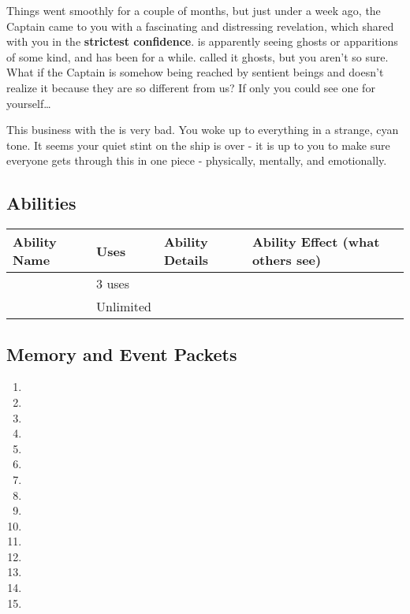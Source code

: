 \documentclass[char]{TMFHope}
\begin{document}
Things went smoothly for a couple of months, but just under a week ago, the Captain came to you with a fascinating and distressing revelation, which \cCap{\they} shared with you in the \textbf{strictest confidence}. \cCap{} is apparently seeing ghosts or apparitions of some kind, and has been for a while. \cCap{\They} called it ghosts, but you aren't so sure. What if the Captain is somehow being reached by sentient beings and doesn't realize it because they are so different from us? If only you could see one for yourself\ldots

This business with the \pNew{} is very bad. You woke up to everything in a strange, cyan tone. It seems your quiet stint on the ship is over - it is up to you to make sure everyone gets through this in one piece - physically, mentally, and emotionally.

\subsection*{Abilities}
\begin{tabular}{|p{3cm}|p{1.5cm}|p{6.5cm}|p{5cm}|} 
 \hline
 \textbf{Ability Name} & \textbf{Uses} & \textbf{Ability Details} & \textbf{Ability Effect (what others see)} \\ 
\hline 
\aFirstAid{\MYname} & 3 uses & \aFirstAid{\MYtext} & \aFirstAid{\MYeffect}\\ 
 \hline
	\aPractice{\MYname} & Unlimited & \aPractice{\MYtext} & \aPractice{\MYeffect} \\ 
\hline
\end{tabular}

\subsection*{Memory and Event Packets}
\begin{enumerate}
	\item \mPractice{\MYname}
	\item \mMedOne{\MYname}
	\item \mMedTwo{\MYname}
	\item \mMedThree{\MYname}
	\item \mMedFour{\MYname}
	\item \mMedFive{\MYname}
	\item \mMedSix{\MYname}
	\item \mMedSeven{\MYname}
	\item \mBroom{\MYname}
	\item \mLab{\MYname}
	\item \mPatient{\MYname}
	\item \mKitchen{\MYname}
	\item \mWeight{\MYname}
	\item \mTheater{\MYname}
	\item \mCrates{\MYname}
\end{enumerate}
\end{document}
